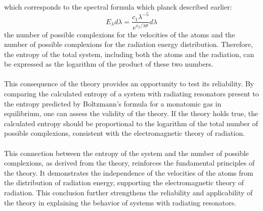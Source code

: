 \documentclass[9pt,a4paper, twocolumn]{article}
\newcounter{theo}
\begin{document}
            which corresponds to the spectral formula which planck described earlier:
            \begin{equation}
                E_\lambda d\lambda = \frac{c_1\lambda^{-5}}{e^{c_2/\lambda\theta}}d\lambda
            \end{equation}
            the number of possible complexions for the velocities of the atoms and the number of possible complexions for the radiation energy distribution. Therefore, the entropy of the total system, including both the atoms and the radiation, can be expressed as the logarithm of the product of these two numbers.
            \\
            \\
            This consequence of the theory provides an opportunity to test its reliability. By comparing the calculated entropy of a system with radiating resonators present to the entropy predicted by Boltzmann's formula for a monatomic gas in equilibrium, one can assess the validity of the theory. If the theory holds true, the calculated entropy should be proportional to the logarithm of the total number of possible complexions, consistent with the electromagnetic theory of radiation.
            \\
            \\
            This connection between the entropy of the system and the number of possible complexions, as derived from the theory, reinforces the fundamental principles of the theory. It demonstrates the independence of the velocities of the atoms from the distribution of radiation energy, supporting the electromagnetic theory of radiation. This conclusion further strengthens the reliability and applicability of the theory in explaining the behavior of systems with radiating resonators.
\end{document}
